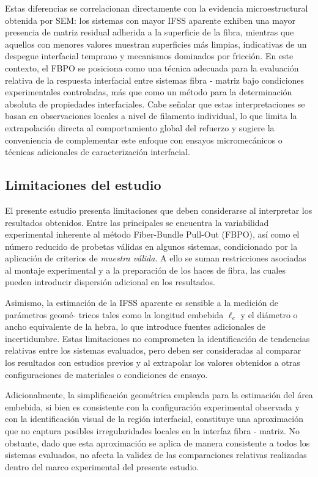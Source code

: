 Estas diferencias se correlacionan directamente con la evidencia microestructural obtenida por
SEM: los sistemas con mayor IFSS aparente exhiben una mayor presencia de matriz residual adherida
a la superficie de la fibra, mientras que aquellos con menores valores muestran superficies más
limpias, indicativas de un despegue interfacial temprano y mecanismos dominados por fricción. En
este contexto, el FBPO se posiciona como una técnica adecuada para la evaluación relativa de la
respuesta interfacial entre sistemas fibra - matriz bajo condiciones experimentales controladas,
más que como un método para la determinación absoluta de propiedades interfaciales. Cabe señalar
que estas interpretaciones se basan en observaciones locales a nivel de filamento individual, lo
que limita la extrapolación directa al comportamiento global del refuerzo y sugiere la
conveniencia de complementar este enfoque con ensayos micromecánicos o técnicas adicionales de
caracterización interfacial.

\subsection{Limitaciones del estudio}

El presente estudio presenta limitaciones que deben considerarse al interpretar los resultados
obtenidos. Entre las principales se encuentra la variabilidad experimental inherente al método
Fiber-Bundle Pull-Out (FBPO), así como el número reducido de probetas válidas en algunos sistemas,
condicionado por la aplicación de criterios de \emph{muestra válida}. A ello se suman
restricciones asociadas al montaje experimental y a la preparación de los haces de fibra, las
cuales pueden introducir dispersión adicional en los resultados.

Asimismo, la estimación de la IFSS aparente es sensible a la medición de parámetros geomé- tricos
tales como la longitud embebida \(\ell_e\) y el diámetro o ancho equivalente de la hebra, lo que
introduce fuentes adicionales de incertidumbre. Estas limitaciones no comprometen la
identificación de tendencias relativas entre los sistemas evaluados, pero deben ser consideradas
al comparar los resultados con estudios previos y al extrapolar los valores obtenidos a otras
configuraciones de materiales o condiciones de ensayo.

Adicionalmente, la simplificación geométrica empleada para la estimación del área embebida,
si bien es consistente con la configuración experimental observada y con la identificación
visual de la región interfacial, constituye una aproximación que no captura posibles
irregularidades locales en la interfaz fibra - matriz. No obstante, dado que esta aproximación se
aplica de manera consistente a todos los sistemas evaluados, no afecta la validez de las
comparaciones relativas realizadas dentro del marco experimental del presente estudio.

